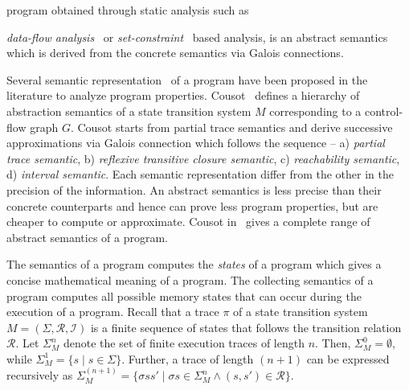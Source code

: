 program obtained through static analysis such as {\emph{data-flow
analysis}~\cite{flow-book} or \emph{set-constraint}~\cite{Cousot:1995} 
based analysis, is an abstract semantics which is derived from the concrete 
semantics via Galois connections. 


Several semantic representation~\cite{Cousot04,semantic02} of a program have been proposed
in the literature to analyze program properties.  Cousot~\cite{Cousot04} defines
a hierarchy of abstraction semantics of a state transition system $M$ corresponding to a 
control-flow graph $G$.  Cousot starts from partial trace semantics and derive successive
approximations via Galois connection which follows the sequence -- a) \emph{partial 
trace semantic}, b) \emph{reflexive transitive closure semantic}, 
c) \emph{reachability semantic}, d) \emph{interval semantic}. Each semantic 
representation differ from the other in the precision of the information.  An 
abstract semantics is less precise than their concrete counterparts and hence 
can prove less program properties, but are cheaper to compute or approximate.  
Cousot in~\cite{semantic02} gives a complete range of abstract semantics of a program.
%


%
The semantics of a program computes the \emph{states} of a program which gives a
concise mathematical meaning of a program.  The collecting semantics of a
program computes all possible memory states that can occur during the execution
of a program.
%
Recall that a trace $\pi$ of a state transition system $M=(\Sigma, \mathcal{R},
\mathcal{I})$ is a finite sequence of states that follows the transition
relation $\mathcal{R}$.  Let $\Sigma_{M}^n$ denote the set of finite execution 
traces of length $n$. Then, $\Sigma_M^0=\emptyset$, while  
$\Sigma_M^1=\{s \mid s\in \Sigma\}$. 
Further, a trace of length $(n+1)$ can be expressed recursively as 
$\Sigma_M^{(n+1)}=\{\sigma ss' \mid \sigma s\in \Sigma_{M}^n \wedge (s,s') \in
\mathcal{R}\}$.   
%


}
